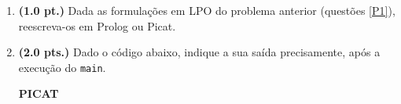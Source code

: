 \documentclass[a4paper,11pt]{article}
\begin{document}
\begin{enumerate}
\begin{comment}
\item  \label{P2} {\bf (2.0 pts.)} Na universidade de Berkeley há pré-requisitos entre algumas disciplinas.
Ou seja, \textit{toda disciplina $x$ que é um pré-requisito de alguma disciplina $y$, 
então $x$ deve preceder $y$}. Esta sequência
 de pré-requisitos eventualmente atrasa a graduação de alguns estudantes por lá. Fato similar ocorre por aqui!
 Assim, a situação desta grade-curricular é dada pelo 
 conjunto das seguintes fórmulas em lógica de primeira-ordem (LPO):
\\
  $$\begin{array}{llr} \hline\hline
	(1) & requisito(a, b) & (\text{leia-se: ``a é pré-requisito de b''}) \\
	(2) & requisito(a, c) &  \\
	(3) & requisito(a, d) &  \\
	(4) & requisito(b, e) &  \\
	(5) & requisito(c, e) & \\
			(6) & requisito(d, e) & \\
				(7) & requisito( e, f) & \\
	(8) & \forall x ~\exists y: requisito(x, y) \rightarrow precede(x, y) & \\
	(9) & \forall x ~\exists z ~\exists y: (requisito(x, z) \wedge precede(z, y)) \rightarrow precede(x,y) &\\
	\hline\hline
	\end{array}$$	
 Utilizando as propriedades da LPO, PU's, PE's e regras de inferências,  demonstre que a disciplina  \/`\textbf{a}' \/ deve preceder \/`\textbf{f}'.

\end{comment}

\item {\bf (1.0 pt.)} Dada as formulações
em LPO do problema anterior (questões \ref{P1}),  reescreva-os em Prolog ou Picat.
  
\newpage
\item {\bf (2.0 pts.)} Dado o código abaixo, indique a sua saída precisamente, após   a execução do \texttt{main}. 


\begin{minipage}{0.45\textwidth}
\begin{tiny}
\begin{center}{\bf PICAT}\end{center}
\begin{verbatim}


\end{verbatim}
\end{tiny}
\end{minipage}
\end{enumerate}
\end{document}

